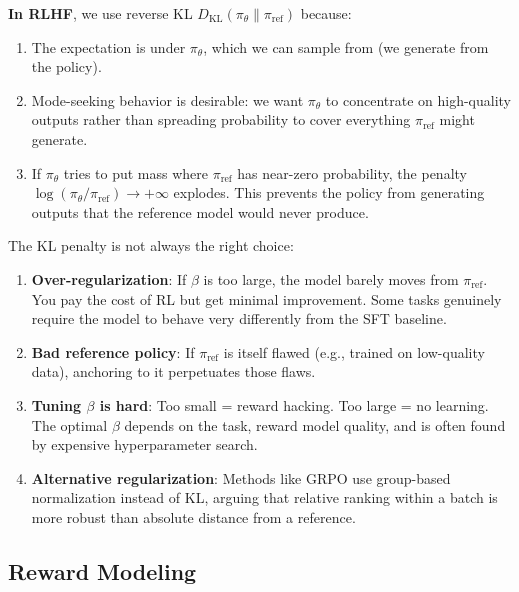 \begin{remark}
    \textbf{In RLHF}, we use reverse KL $D_{\mathrm{KL}}(\pi_\theta \| \pi_{\text{ref}})$ because:
    \begin{enumerate}
        \item The expectation is under $\pi_\theta$, which we can sample from (we generate from the policy).
        \item Mode-seeking behavior is desirable: we want $\pi_\theta$ to concentrate on high-quality outputs rather than spreading probability to cover everything $\pi_{\text{ref}}$ might generate.
        \item If $\pi_\theta$ tries to put mass where $\pi_{\text{ref}}$ has near-zero probability, the penalty $\log(\pi_\theta / \pi_{\text{ref}}) \to +\infty$ explodes. This prevents the policy from generating outputs that the reference model would never produce.
    \end{enumerate}
\end{remark}

\begin{remark}
    The KL penalty is not always the right choice:
    \begin{enumerate}
        \item \textbf{Over-regularization}: If $\beta$ is too large, the model barely moves from $\pi_{\text{ref}}$. You pay the cost of RL but get minimal improvement. Some tasks genuinely require the model to behave very differently from the SFT baseline.

        \item \textbf{Bad reference policy}: If $\pi_{\text{ref}}$ is itself flawed (e.g., trained on low-quality data), anchoring to it perpetuates those flaws.

        \item \textbf{Tuning $\beta$ is hard}: Too small = reward hacking. Too large = no learning. The optimal $\beta$ depends on the task, reward model quality, and is often found by expensive hyperparameter search.

        \item \textbf{Alternative regularization}: Methods like GRPO use group-based normalization instead of KL, arguing that relative ranking within a batch is more robust than absolute distance from a reference.
    \end{enumerate}
\end{remark}

\subsection{Reward Modeling}

